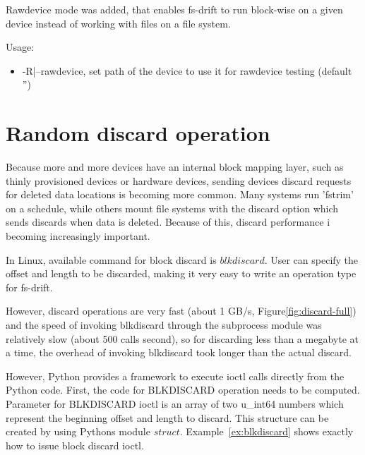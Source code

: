 \documentclass[
  color, %
  table, %
  lof,   %
  lot,   %
]{fithesis3}
\begin{document}
Rawdevice mode was added, that enables fs-drift to run block-wise on a given device instead of working with files on a file system.

Usage:
\begin{itemize}
    \item -R|--rawdevice, set path of the device to use it for rawdevice testing (default '')
\end{itemize}


\section{Random discard operation}


Because more and more devices have an internal block mapping layer, such as thinly provisioned devices or hardware devices, sending devices discard requests for deleted data locations is becoming more common. Many systems run 'fstrim' on a schedule, while others mount file systems with the discard option which sends discards when data is deleted. Because of this, discard performance i becoming increasingly important.

In Linux, available command for block discard is $blkdiscard$. User can specify the offset and length to be discarded, making it very easy to write an operation type for fs-drift.


However, discard operations are very fast (about 1 GB/s, Figure\ref{fig:discard-full}) and the speed of invoking blkdiscard through the subprocess module was relatively slow (about 500 calls second), so for discarding less than a megabyte at a time, the overhead of invoking blkdiscard took longer than the actual discard.

However, Python provides a framework to execute ioctl calls directly from the Python code. First, the code for BLKDISCARD operation needs to be computed. Parameter for BLKDISCARD ioctl is an array of two u\_int64 numbers which represent the beginning offset and length to discard. This structure can be created by using Pythons module $struct$. Example~\ref{ex:blkdiscard} shows exactly how to issue block discard ioctl.
\end{document}
